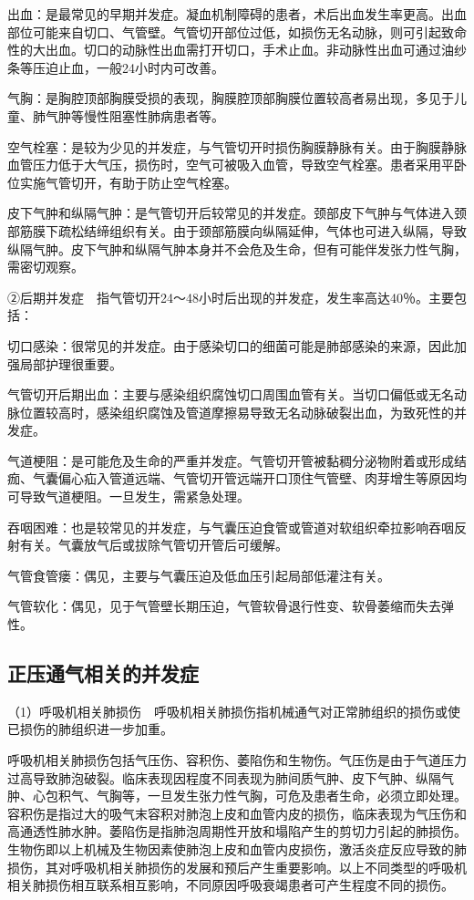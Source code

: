 出血：是最常见的早期并发症。凝血机制障碍的患者，术后出血发生率更高。出血部位可能来自切口、气管壁。气管切开部位过低，如损伤无名动脉，则可引起致命性的大出血。切口的动脉性出血需打开切口，手术止血。非动脉性出血可通过油纱条等压迫止血，一般24小时内可改善。

气胸：是胸腔顶部胸膜受损的表现，胸膜腔顶部胸膜位置较高者易出现，多见于儿童、肺气肿等慢性阻塞性肺病患者等。

空气栓塞：是较为少见的并发症，与气管切开时损伤胸膜静脉有关。由于胸膜静脉血管压力低于大气压，损伤时，空气可被吸入血管，导致空气栓塞。患者采用平卧位实施气管切开，有助于防止空气栓塞。

皮下气肿和纵隔气肿：是气管切开后较常见的并发症。颈部皮下气肿与气体进入颈部筋膜下疏松结缔组织有关。由于颈部筋膜向纵隔延伸，气体也可进入纵隔，导致纵隔气肿。皮下气肿和纵隔气肿本身并不会危及生命，但有可能伴发张力性气胸，需密切观察。

②后期并发症　指气管切开24～48小时后出现的并发症，发生率高达40％。主要包括：

切口感染：很常见的并发症。由于感染切口的细菌可能是肺部感染的来源，因此加强局部护理很重要。

气管切开后期出血：主要与感染组织腐蚀切口周围血管有关。当切口偏低或无名动脉位置较高时，感染组织腐蚀及管道摩擦易导致无名动脉破裂出血，为致死性的并发症。

气道梗阻：是可能危及生命的严重并发症。气管切开管被黏稠分泌物附着或形成结痂、气囊偏心疝入管道远端、气管切开管远端开口顶住气管壁、肉芽增生等原因均可导致气道梗阻。一旦发生，需紧急处理。

吞咽困难：也是较常见的并发症，与气囊压迫食管或管道对软组织牵拉影响吞咽反射有关。气囊放气后或拔除气管切开管后可缓解。

气管食管瘘：偶见，主要与气囊压迫及低血压引起局部低灌注有关。

气管软化：偶见，见于气管壁长期压迫，气管软骨退行性变、软骨萎缩而失去弹性。

\subsection{正压通气相关的并发症}

（1）呼吸机相关肺损伤　呼吸机相关肺损伤指机械通气对正常肺组织的损伤或使已损伤的肺组织进一步加重。

呼吸机相关肺损伤包括气压伤、容积伤、萎陷伤和生物伤。气压伤是由于气道压力过高导致肺泡破裂。临床表现因程度不同表现为肺间质气肿、皮下气肿、纵隔气肿、心包积气、气胸等，一旦发生张力性气胸，可危及患者生命，必须立即处理。容积伤是指过大的吸气末容积对肺泡上皮和血管内皮的损伤，临床表现为气压伤和高通透性肺水肿。萎陷伤是指肺泡周期性开放和塌陷产生的剪切力引起的肺损伤。生物伤即以上机械及生物因素使肺泡上皮和血管内皮损伤，激活炎症反应导致的肺损伤，其对呼吸机相关肺损伤的发展和预后产生重要影响。以上不同类型的呼吸机相关肺损伤相互联系相互影响，不同原因呼吸衰竭患者可产生程度不同的损伤。

